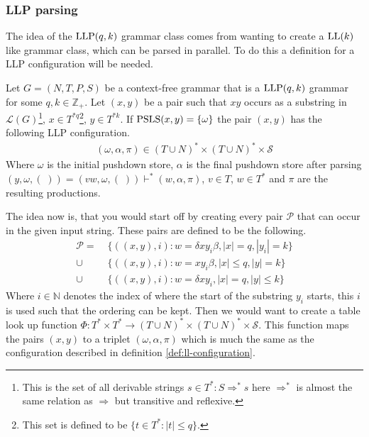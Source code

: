 \subsubsection{LLP parsing}
The idea of the $\text{LLP}(q, k)$ grammar class comes from wanting to create a $\text{LL}(k)$ like grammar class, which can be parsed in parallel. To do this a definition for a LLP configuration will be needed.
\begin{definition}
    \label{def:llp-configuration}
    Let $G = (N, T, P, S)$ be a context-free grammar that is a $\text{LLP}(q, k)$ grammar for some $q, k \in \mathbb{Z}_+$. Let $(x, y)$ be a pair such that $xy$ occurs as a substring in $\mathcal{L}(G)$\footnote{This is the set of all derivable strings ${s \in T^* : S \Rightarrow^* s}$ here $\Rightarrow^*$ is almost the same relation as $\Rightarrow$ but transitive and reflexive.}, $x \in T^{*q}$\footnote{This set is defined to be $\{t \in T^* : |t| \leq q\}$.}, $y \in T^{*k}$. If $\text{PSLS}(x,y) = \{\omega\}$ the pair $(x, y)$ has the following LLP configuration.
    \begin{align*}
        (\omega, \alpha, \pi) \in (T \cup N)^* \times (T \cup N)^* \times \mathcal{S}
    \end{align*}
    Where $\omega$ is the initial pushdown store, $\alpha$ is the final pushdown store after parsing $(y, \omega, (\;)) = (vw, \omega, (\;)) \vdash^* (w, \alpha, \pi)$, $v \in T$, $w \in T^*$ and $\pi$ are the resulting productions.
\end{definition}
\noindent The idea now is, that you would start off by creating every pair $\mathcal{P}$ that can occur in the given input string. These pairs are defined to be the following.
\begin{align*}
    \mathcal{P} =&\; \{((x, y), i) : w = \delta xy_i \beta, |x| = q, |y_i| = k\} \\
    \cup&\; \{((x, y), i) : w = xy_i \beta, |x| \leq q, |y| = k\} \\
    \cup&\; \{((x, y), i) : w = \delta xy_i, |x| = q, |y| \leq k\}
\end{align*}
Where $i \in \mathbb{N}$ denotes the index of where the start of the substring $y_i$ starts, this $i$ is used such that the ordering can be kept. Then we would want to create a table look up function $\Phi: T^* \times T^* \to (T \cup N)^* \times (T \cup N)^* \times \mathcal{S}$. This function maps the pairs $(x,y)$ to a triplet $(\omega, \alpha, \pi)$ which is much the same as the configuration described in definition \ref{def:ll-configuration}. 

